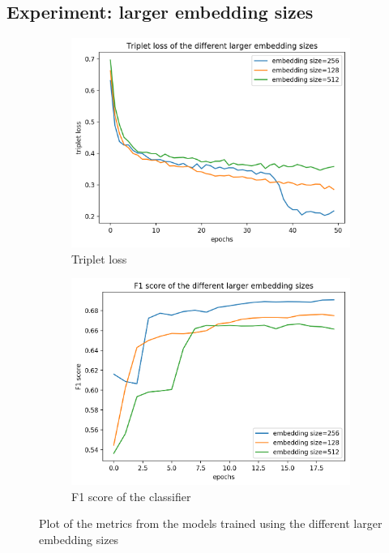 \subsection{Experiment: larger embedding sizes}
\label{sub:Experiment-Larger-Embedding-Sizes}
\begin{figure}[htb]
\centering
\begin{subfigure}{.5\linewidth}
  \centering
  \includegraphics[width=.9\linewidth]{img/triplet_loss_dcase_embedding_large.png}
  \caption{Triplet loss}
  \label{fig:plot-triplet-loss-embedding-sizes-larger}
\end{subfigure}%
\begin{subfigure}{.5\linewidth}
  \centering
  \includegraphics[width=.9\linewidth]{img/f1_dcase_embedding_large.png}
  \caption{F1 score of the classifier}
  \label{fig:classifier-f1-embedding-sizes-larger}
\end{subfigure}
\caption{Plot of the metrics from the models trained using the different larger embedding sizes}
\label{fig:embedding-sizes-larger-experiment-metrics}
\end{figure}
